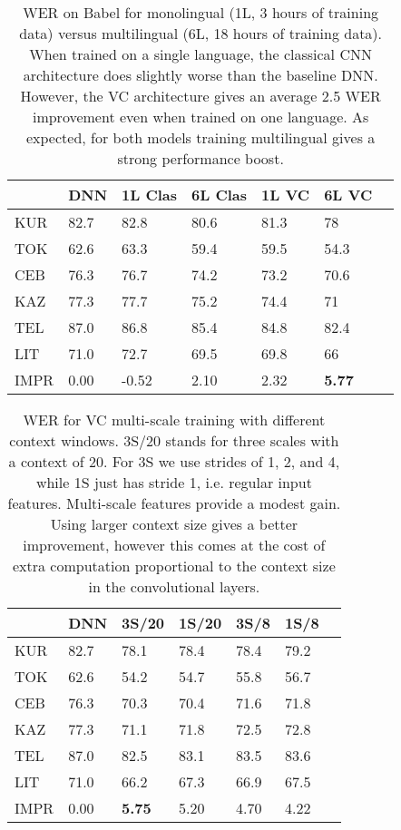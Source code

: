 \documentclass{article}
\begin{document}
\begin{table}[ht]
\centering
\begin{tabular}{l | l | lllll}
     & DNN  & 1L Clas    & 6L Clas    & 1L VC  & 6L VC  \\ \hline
KUR      & 82.7 & 82.8    & 80.6    & 81.3  & 78    \\
TOK      & 62.6 & 63.3    & 59.4    & 59.5  & 54.3  \\
CEB      & 76.3 & 76.7    & 74.2    & 73.2  & 70.6  \\
KAZ      & 77.3 & 77.7    & 75.2    & 74.4  & 71    \\
TEL      & 87.0 & 86.8    & 85.4    & 84.8  & 82.4  \\
LIT      & 71.0 & 72.7    & 69.5    & 69.8  & 66    \\ \hline
IMPR     & 0.00 & -0.52   & 2.10    & 2.32  & \bf{5.77}
\end{tabular}
\caption{\label{tab:multiling}WER on Babel for monolingual (1L, 3 hours of training data) versus 
    multilingual (6L, 18 hours of training data).
    When trained on a single language, the classical CNN architecture does slightly worse than the baseline DNN.
    However, the VC architecture gives an average 2.5 WER improvement even when trained on one language.
    As expected, for both models training multilingual gives a strong performance boost.}
\end{table}

\begin{table}[ht]
\centering
\begin{tabular}{l | l | lllll}
     & DNN  & 3S/20 & 1S/20 & 3S/8 & 1S/8 \\ \hline
KUR  & 82.7 & 78.1  & 78.4  & 78.4 & 79.2 \\
TOK  & 62.6 & 54.2  & 54.7  & 55.8 & 56.7 \\
CEB  & 76.3 & 70.3  & 70.4  & 71.6 & 71.8 \\
KAZ  & 77.3 & 71.1  & 71.8  & 72.5 & 72.8 \\
TEL  & 87.0 & 82.5  & 83.1  & 83.5 & 83.6 \\
LIT  & 71.0 & 66.2  & 67.3  & 66.9 & 67.5 \\ \hline
IMPR & 0.00 & \bf{5.75}  & 5.20  & 4.70 & 4.22
\end{tabular}
\caption{\label{tab:multiscale}WER for VC multi-scale training with different context windows.
    3S/20 stands for three scales with a context of 20.
    For 3S we use strides of 1, 2, and 4, while 1S just has stride 1, i.e. regular input features.
    Multi-scale features provide a modest gain. 
    Using larger context size gives a better improvement, however this comes
    at the cost of extra computation proportional to the context size in the convolutional layers.}
\end{table}
\end{document}
